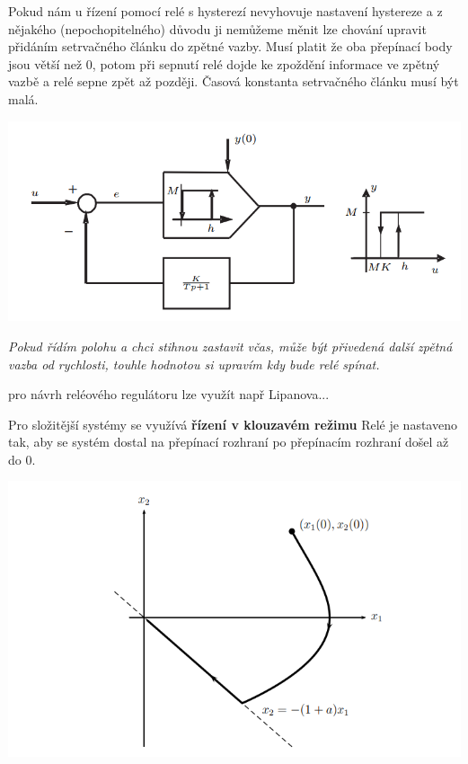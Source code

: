 Pokud nám u řízení pomocí relé s hysterezí nevyhovuje nastavení hystereze a z nějakého (nepochopitelného) důvodu ji nemůžeme měnit lze chování upravit přidáním setrvačného článku do zpětné vazby.
Musí platit že oba přepínací body jsou větší než 0, potom při sepnutí relé dojde ke zpoždění informace ve zpětný vazbě a relé sepne zpět až později. Časová konstanta setrvačného článku musí být malá.

\includegraphics{img/rele_reg.png}

{ \it
    Pokud řídím polohu a chci stihnou zastavit včas, může být přivedená další zpětná vazba od rychlosti, touhle hodnotou si upravím kdy bude relé spínat.
}

pro návrh reléového regulátoru lze využít např Lipanova...

Pro složitější systémy se využívá {\bf řízení v klouzavém režimu}
Relé je nastaveno tak, aby se systém dostal na přepínací rozhraní  po přepínacím rozhraní došel až do 0.

\includegraphics{img/kluzavy_obr.png}

